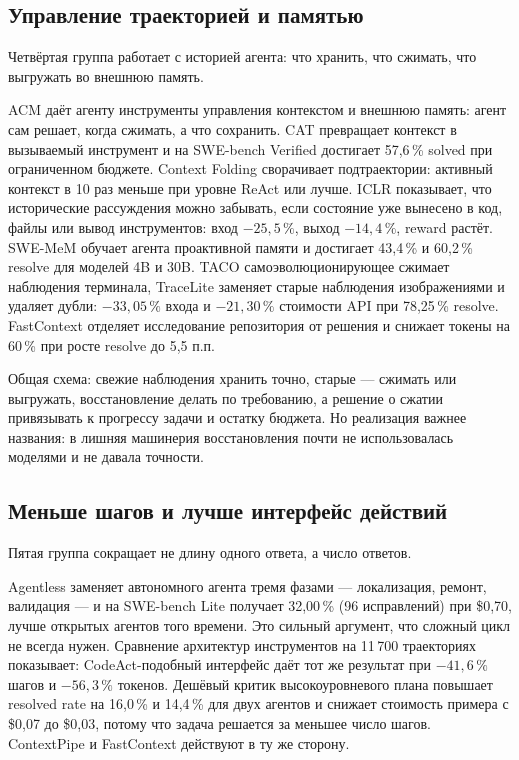 \documentclass[11pt,a4paper]{article}
\begin{document}
\subsection{Управление траекторией и памятью}

Четвёртая группа работает с историей агента: что хранить, что сжимать, что
выгружать во внешнюю память.

ACM \cite{li2026acmagentic} даёт агенту инструменты управления контекстом и
внешнюю память: агент сам решает, когда сжимать, а что сохранить. CAT
\cite{liu2025contexttool} превращает контекст в вызываемый инструмент и на
SWE-bench Verified достигает 57{,}6\,\% solved при ограниченном бюджете.
Context Folding \cite{sun2025scalinglong} сворачивает подтраектории: активный
контекст в 10 раз меньше при уровне ReAct или лучше. ICLR
\cite{wang2026agentsforget} показывает, что исторические рассуждения можно
забывать, если состояние уже вынесено в код, файлы или вывод инструментов:
вход $-25{,}5\,\%$, выход $-14{,}4\,\%$, reward растёт. SWE-MeM
\cite{gao2026swemem} обучает агента проактивной памяти и достигает
43{,}4\,\% и 60{,}2\,\% resolve для моделей 4B и 30B. TACO
\cite{ren2026selfevolving} самоэволюционирующее сжимает наблюдения
терминала, TraceLite \cite{xiao2026traceliteefficient} заменяет старые
наблюдения изображениями и удаляет дубли: $-33{,}05\,\%$ входа и
$-21{,}30\,\%$ стоимости API при 78{,}25\,\% resolve. FastContext
\cite{zhang2026fastcontexttrainin} отделяет исследование репозитория от
решения и снижает токены на 60\,\% при росте resolve до 5{,}5 п.п.

Общая схема: свежие наблюдения хранить точно, старые — сжимать или
выгружать, восстановление делать по требованию, а решение о сжатии
привязывать к прогрессу задачи и остатку бюджета. Но реализация важнее
названия: в \cite{fan2026empiricalstudy} лишняя машинерия восстановления
почти не использовалась моделями и не давала точности.

\subsection{Меньше шагов и лучше интерфейс действий}

Пятая группа сокращает не длину одного ответа, а число ответов.

Agentless \cite{xia2024agentlessdemystify} заменяет автономного агента
тремя фазами — локализация, ремонт, валидация — и на SWE-bench Lite
получает 32{,}00\,\% (96 исправлений) при \$0{,}70, лучше открытых агентов
того времени. Это сильный аргумент, что сложный цикл не всегда нужен.
Сравнение архитектур инструментов \cite{xu2026devilinterface} на 11\,700
траекториях показывает: CodeAct-подобный интерфейс даёт тот же результат
при $-41{,}6\,\%$ шагов и $-56{,}3\,\%$ токенов. Дешёвый критик
высокоуровневого плана \cite{gandhi2026steerdon} повышает resolved rate на
16{,}0\,\% и 14{,}4\,\% для двух агентов и снижает стоимость примера с
\$0{,}07 до \$0{,}03, потому что задача решается за меньшее число шагов.
ContextPipe \cite{xu2026contextpipedatabas} и FastContext
\cite{zhang2026fastcontexttrainin} действуют в ту же сторону.
\end{document}

